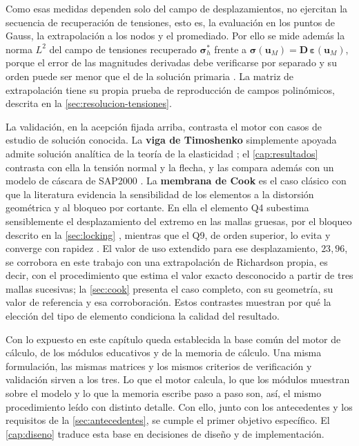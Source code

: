 Como esas medidas dependen solo del campo de desplazamientos, no ejercitan la secuencia de recuperación de tensiones, esto es, la evaluación en los puntos de Gauss, la extrapolación a los nodos y el promediado. Por ello se mide además la norma $L^2$ del campo de tensiones recuperado $\bm{\sigma}^*_h$ frente a $\bm{\sigma}(\bm{u}_M)=\bm{D}\,\bm{\varepsilon}(\bm{u}_M)$, porque el error de las magnitudes derivadas debe verificarse por separado y su orden puede ser menor que el de la solución primaria \autocite[p.~29]{salari2000mms}. La matriz de extrapolación tiene su propia prueba de reproducción de campos polinómicos, descrita en la \autoref{sec:resolucion-tensiones}.

La validación, en la acepción fijada arriba, contrasta el motor con casos de estudio de solución conocida. La \textbf{viga de Timoshenko} simplemente apoyada admite solución analítica de la teoría de la elasticidad \autocite[art.~21, pp.~39-43]{timoshenko1970elasticity}; el \autoref{cap:resultados} contrasta con ella la tensión normal y la flecha, y las compara además con un modelo de cáscara de SAP2000 \autocite[p.~179]{csi2017sap2000}. La \textbf{membrana de Cook} es el caso clásico con que la literatura evidencia la sensibilidad de los elementos a la distorsión geométrica y al bloqueo por cortante. En ella el elemento Q4 subestima sensiblemente el desplazamiento del extremo en las mallas gruesas, por el bloqueo descrito en la \autoref{sec:locking} \autocite[pp.~98-99]{cook2002concepts}, mientras que el Q9, de orden superior, lo evita y converge con rapidez \autocite[p.~243]{hughes2000fem}. El valor de uso extendido para ese desplazamiento, $23{,}96$, se corrobora en este trabajo con una extrapolación de Richardson propia, es decir, con el procedimiento que estima el valor exacto desconocido a partir de tres mallas sucesivas; la \autoref{sec:cook} presenta el caso completo, con su geometría, su valor de referencia y esa corroboración. Estos contrastes muestran por qué la elección del tipo de elemento condiciona la calidad del resultado.

Con lo expuesto en este capítulo queda establecida la base común del motor de cálculo, de los módulos educativos y de la memoria de cálculo. Una misma formulación, las mismas matrices y los mismos criterios de verificación y validación sirven a los tres. Lo que el motor calcula, lo que los módulos muestran sobre el modelo y lo que la memoria escribe paso a paso son, así, el mismo procedimiento leído con distinto detalle. Con ello, junto con los antecedentes y los requisitos de la \autoref{sec:antecedentes}, se cumple el primer objetivo específico. El \autoref{cap:diseno} traduce esta base en decisiones de diseño y de implementación.
